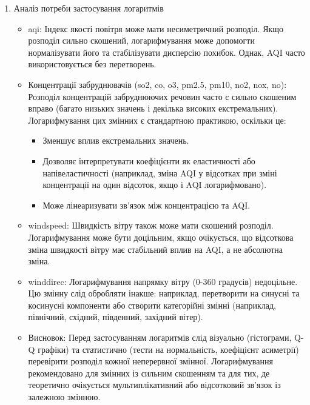 \documentclass{article}
\begin{document}
\begin{enumerate}
    \item Аналіз потреби застосування логаритмів
    \begin{itemize}
        \item aqi: Індекс якості повітря може мати несиметричний розподіл. Якщо розподіл сильно скошений, логарифмування може допомогти нормалізувати його та стабілізувати дисперсію похибок. Однак, AQI часто використовується без перетворень.
        \item Концентрації забруднювачів (so2, co, o3, pm2.5, pm10, no2, nox, no): Розподіл концентрацій забруднюючих речовин часто є сильно скошеним вправо (багато низьких значень і декілька високих екстремальних). Логарифмування цих змінних є стандартною практикою, оскільки це:
        \begin{itemize}
            \item Зменшує вплив екстремальних значень.
            \item Дозволяє інтерпретувати коефіцієнти як еластичності або напівеластичності (наприклад, зміна AQI у відсотках при зміні концентрації на один відсоток, якщо і AQI логарифмовано).
            \item Може лінеаризувати зв'язок між концентрацією та AQI.
        \end{itemize}
        \item windspeed: Швидкість вітру також може мати скошений розподіл. Логарифмування може бути доцільним, якщо очікується, що відсоткова зміна швидкості вітру має стабільний вплив на AQI, а не абсолютна зміна.
        \item winddirec: Логарифмування напрямку вітру (0-360 градусів) недоцільне. Цю змінну слід обробляти інакше: наприклад, перетворити на синусні та косинусні компоненти або створити категорійні змінні (наприклад, північний, східний, південний, західний вітер).
        \item Висновок: Перед застосуванням логаритмів слід візуально (гістограми, Q-Q графіки) та статистично (тести на нормальність, коефіцієнт асиметрії) перевірити розподіл кожної неперервної змінної. Логарифмування рекомендовано для змінних із сильним скошенням та для тих, де теоретично очікується мультиплікативний або відсотковий зв'язок із залежною змінною.
    \end{itemize}


\end{enumerate}
\end{document}
